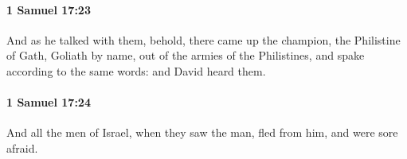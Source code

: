 		\paragraph{1 Samuel 17:23} %
			\label{1SAMUEL-17-23}

			And as he talked with them, behold, there came up the champion, the Philistine of Gath, Goliath by name, out of the armies of the Philistines, and spake according to the same words: and David heard them.


		\paragraph{1 Samuel 17:24} %
			\label{1SAMUEL-17-24}

			And all the men of Israel, when they saw the man, fled from him, and were sore afraid.


